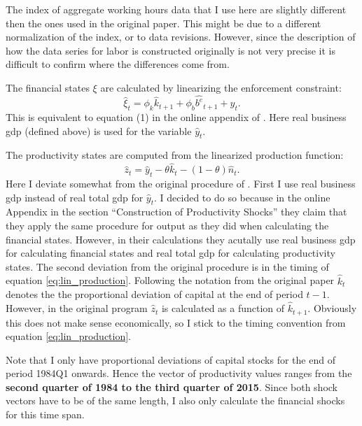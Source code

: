 The index of aggregate working hours data that I use here are slightly
different then the ones used in the original paper. This might be due to a
different normalization of the index, or to data revisions. However, since the
description of how the data series for labor is constructed originally is not
very precise it is difficult to confirm where the differences come from.

The financial states \( \xi \) are calculated by linearizing the enforcement
constraint:
\begin{equation}
\label{eq:fin_shock_correct_timing}
    \hat{\xi}_t = \phi_k \hat{k}_{t+1} + \phi_b \hat{b^e}_{t+1} + \hat{y}_t.
\end{equation}
This is equivalent to equation (1) in the online appendix of
\textcite{jerman_macroeconomic_2012}. Here real business gdp (defined above) is
used for the variable \(\hat{y}_t\).

The productivity states are computed from the linearized production function:
\begin{equation}
\label{eq:lin_production}
    \hat{z}_t = \hat{y}_t - \theta \hat{k}_t - (1 - \theta) \hat{n}_t.
\end{equation}
Here I deviate somewhat from the original procedure of
\citeauthor{jerman_macroeconomic_2012}. First I use real business gdp instead
of real total gdp for \(\hat{y}_t\). I decided to do so because in the online
Appendix in the section ``Construction of Productivity Shocks'' they claim that
they apply the same procedure for output as they did when calculating the
financial states. However, in their calculations they acutally use real
business gdp for calculating financial states and real total gdp for
calculating productivity states. The second deviation from the original
procedure is in the timing of equation \ref{eq:lin_production}. Following the
notation from the original paper \(\hat{k}_t\) denotes the the proportional
deviation of capital at the end of period \(t - 1\). However, in the original
program \(\hat{z}_t\) is calculated as a function of \(\hat{k}_{t +
  1}\). Obviously this does not make sense economically, so I stick to the
timing convention from equation \ref{eq:lin_production}.

Note that I only have proportional deviations of capital stocks for the end of
period 1984Q1 onwards. Hence the vector of productivity values ranges from the
\textbf{second quarter of 1984 to the third quarter of 2015}. Since both shock
vectors have to be of the same length, I also only calculate the financial
shocks for this time span.

